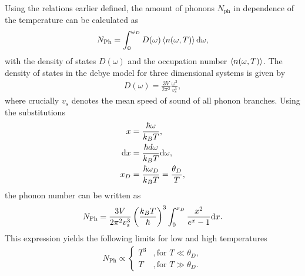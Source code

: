 Using the relations earlier defined, the amount of phonons $N_{\text{ph}}$ in dependence of the temperature can be calculated as
\begin{align}
    N_{\text{Ph}} = \int_0^{\omega_D}D(\omega) \braket{n(\omega,T)}\text d\omega,
    \label{eq:N_ph_int}
\end{align}
with the density of states $D(\omega)$ and the occupation number $\braket{n(\omega,T)}$.
The density of states in the debye model for three dimensional systems is given by 
\begin{align}
    D(\omega) = \frac{3V}{2\pi^2}\frac{\omega^2}{v_s^3},
\end{align}
where crucially $v_s$ denotes the mean speed of sound of all phonon branches.
Using the substitutions
\begin{align}
    \label{eq:substitution_x_II}
    x &= \frac{\hbar\omega}{k_BT}, \\
    \label{eq:substitution_dx_II}
    \text dx &= \frac{\hbar d\omega}{k_BT}\text d\omega, \\
    \label{eq:substitution_x_D}
    x_D &= \frac{\hbar\omega_D}{k_BT} = \frac{\theta_D}{T},
\end{align}
the phonon number can be written as
\begin{align}
    N_{\text{Ph}} = \frac{3V}{2\pi^2v_s^3}\left(\frac{k_BT}{\hbar}\right)^3\int_0^{x_D}\frac{x^2}{e^x-1}\text dx.
    \label{eq:N_ph}
\end{align}
This expression yields the following limits for low and high temperatures
\begin{align}
    N_{\text{Ph}}\propto
    \begin{cases}
        T^3 &, \text{for } T\ll\theta_D, \\
        T &,\text{for } T\gg\theta_D.
    \end{cases}
\end{align}